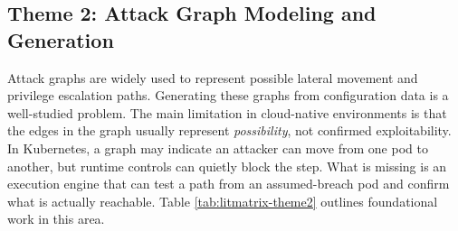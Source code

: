 \documentclass[conference]{IEEEtran}
\begin{document}
\subsection{Theme 2: Attack Graph Modeling and Generation}
Attack graphs are widely used to represent possible lateral movement and privilege escalation paths. Generating these graphs from configuration data is a well-studied problem. The main limitation in cloud-native environments is that the edges in the graph usually represent \emph{possibility}, not confirmed exploitability. In Kubernetes, a graph may indicate an attacker can move from one pod to another, but runtime controls can quietly block the step. What is missing is an execution engine that can test a path from an assumed-breach pod and confirm what is actually reachable. Table \ref{tab:litmatrix-theme2} outlines foundational work in this area.
\end{document}
